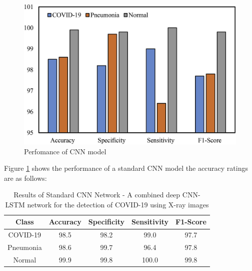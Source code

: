 \vspace{0.5mm}
 \begin{figure}[H]
    \centering
    \includegraphics[width=1\textwidth,height=0.5\textheight]{Images/performanceOfCNN-LSTMPaper.png}
    \caption{Perfomance of CNN model\cite{litReviewCnnLstm}}
    \label{fig:Performance of CNN Model Literature Review}
\end{figure}
Figure \ref{fig:Performance of CNN Model Literature Review} shows the performance of a standard CNN model the accuracy ratings are as follows:
\begin{table}[h]
    \centering
    \begin{tabular}{|c|c|c|c|c|}
    \hline
         Class
         & Accuracy
         & Specificity
         & Sensitivity
         & F1-Score\\
         \hline
         COVID-19 & 98.5 &  98.2 & 99.0 & 97.7 \\
         Pneumonia & 98.6 & 99.7 & 96.4 & 97.8 \\
         Normal & 99.9 & 99.8 & 100.0 & 99.8\\
         \hline
    \end{tabular}
    \caption{Results of Standard CNN Network - A combined deep CNN-LSTM network for the detection of COVID-19 using X-ray images}
    \label{tab:Results of CNN - A combined deep CNN-LSTM network for the detection of COVID-19 using X-ray images}
\end{table}
\vspace{0.5mm}
